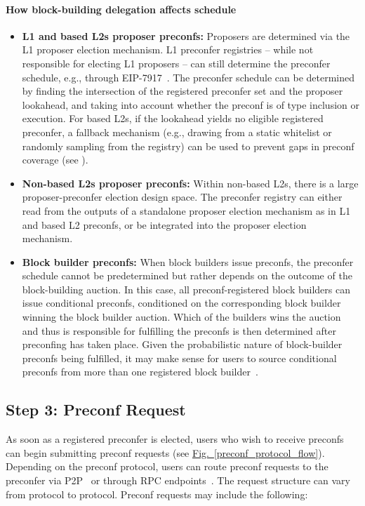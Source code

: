 \documentclass[a4paper]{article}
\theoremstyle{boldstyle}
\begin{document}
\paragraph{How block-building delegation affects schedule}
\begin{itemize}
    \item \textbf{L1 and based L2s proposer preconfs:}  Proposers are determined via the L1 proposer election mechanism. L1 preconfer registries -- while not responsible for electing L1 proposers -- can still determine the preconfer schedule, e.g., through EIP-7917~\cite{EIP7917}. The preconfer schedule can be determined by finding the intersection of the registered preconfer set and the proposer lookahead, and taking into account whether the preconf is of type inclusion or execution. For based L2s, if the lookahead yields no eligible registered preconfer, a fallback mechanism (e.g., drawing from a static whitelist or randomly sampling from the registry) can be used to prevent gaps in preconf coverage (see \cite{fallback}).
    \item \textbf{Non-based L2s proposer preconfs:} Within non-based L2s, there is a large proposer-preconfer election design space. The preconfer registry can either read from the outputs of a standalone proposer election mechanism as in L1 and based L2 preconfs, or be integrated into the proposer election mechanism. 
     \item \textbf{Block builder preconfs:} When block builders issue preconfs, the preconfer schedule cannot be predetermined but rather depends on the outcome of the block-building auction. In this case, all preconf-registered block builders can issue conditional preconfs, conditioned on the corresponding block builder winning the block builder auction. Which of the builders wins the auction and thus is responsible for fulfilling the preconfs is then determined after preconfing has taken place. Given the probabilistic nature of block-builder preconfs being fulfilled, it may make sense for users to source conditional preconfs from more than one registered block builder~\cite{W:LeaderlessandLeader-BasedPreconfirmations}.
\end{itemize}


\subsection{Step 3: Preconf Request} \label{preconf_request}
    As soon as a registered preconfer is elected, users who wish to receive preconfs can begin submitting preconf requests (see \hyperref[preconf_protocol_flow]{Fig.~\ref{preconf_protocol_flow}}). Depending on the preconf protocol, users can route preconf requests to the preconfer via P2P~\cite{W:Documentation-Understandingmev-commit} or through RPC endpoints~\cite{W:Taiyi-off-chaincomponents,W:Towardsanimplementationofbasedpreconfirmationsleveragingrestaking}. The request structure can vary from protocol to protocol. Preconf requests may include the following:
\end{document}

